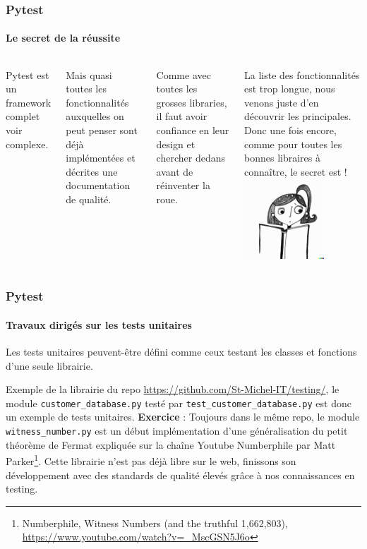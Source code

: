 \documentclass{beamer}
\begin{document}
    \begin{frame}
        \frametitle{Pytest}
        \framesubtitle{Le secret de la réussite}
        \transdissolve
        \begin{columns}
            Pytest est un framework complet voir complexe.

            Mais quasi toutes les fonctionnalités auxquelles on peut penser sont déjà implémentées et décrites une documentation de qualité.

            Comme avec toutes les grosses libraries, il faut avoir confiance en leur design et chercher dedans avant de réinventer la roue.

            La liste des fonctionnalités est trop longue, nous venons juste d'en découvrir les principales.
            \bigbreak
            Donc une fois encore, comme pour toutes les bonnes libraires à connaître, le secret est  !
            \centering
            \includegraphics[width=3cm]{image/girl-rtfm.png}
        \end{columns}

    \end{frame}

    \begin{frame}
        \frametitle{Pytest}
        \framesubtitle{Travaux dirigés sur les tests unitaires}
        \transdissolve
        Les tests unitaires peuvent-être défini comme ceux testant les classes et fonctions d'une seule librairie.

        Exemple de la librairie du repo \url{https://github.com/St-Michel-IT/testing/}, le module \lstinline{customer_database.py} testé par \lstinline{test_customer_database.py} est donc un exemple de tests unitaires.
        \bigbreak
        \textbf{Exercice} : Toujours dans le même repo, le module \lstinline{witness_number.py} est un début implémentation d'une généralisation du petit théorème de Fermat expliquée sur la chaîne Youtube Numberphile par Matt Parker\footnote{Numberphile, Witness Numbers (and the truthful 1,662,803), \url{https://www.youtube.com/watch?v=_MscGSN5J6o}}.
        Cette librairie n'est pas déjà libre sur le web, finissons son développement avec des standards de qualité élevés grâce à nos connaissances en testing.
    \end{frame}
\end{document}
